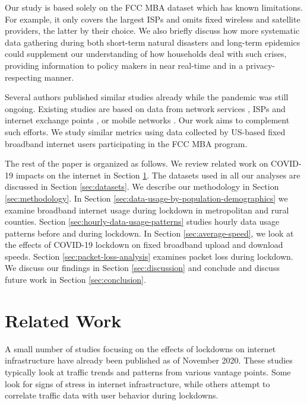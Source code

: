 \documentclass[conference,10pt]{IEEEtran}
\begin{document}
Our study is based solely on the FCC MBA dataset which has known limitations. For example, it only covers the largest ISPs and omits fixed wireless and satellite providers, the latter by their choice. We also briefly discuss how more systematic data gathering during both short-term natural disasters and long-term epidemics could supplement our understanding of how households deal with such crises, providing information to policy makers in near real-time and in a privacy-respecting manner.

Several authors published similar studies already while the pandemic was still ongoing. Existing studies are based on data from network services \cite{bottger2020internet,akamai,facebook}, ISPs and internet exchange points \cite{feldmann2020lockdown,liu2020characterizing}, or mobile networks \cite{lutu2020characterization}. Our work aims to complement such efforts. We study similar metrics using data collected by US-based fixed broadband internet users participating in the FCC MBA program.

The rest of the paper is organized as follows. We review related work on COVID-19 impacts on the internet in Section \ref{sec:related-work}. The datasets used in all our analyses are discussed in Section \ref{sec:datasets}. We describe our methodology in Section \ref{sec:methodology}. In Section \ref{sec:data-usage-by-population-demographics} we examine broadband internet usage during lockdown in metropolitan and rural counties. Section \ref{sec:hourly-data-usage-patterns} studies hourly data usage patterns before and during lockdown. In Section \ref{sec:average-speed}, we look at the effects of COVID-19 lockdown on fixed broadband upload and download speeds. Section \ref{sec:packet-loss-analysis} examines packet loss during lockdown. We discuss our findings in Section \ref{sec:discussion} and conclude and discuss future work in Section \ref{sec:conclusion}.

\section{Related Work}
\label{sec:related-work}



A small number of studies focusing on the effects of lockdowns on internet infrastructure have already been published as of November 2020. These studies typically look at traffic trends and patterns from various vantage points. Some look for signs of stress in internet infrastructure, while others attempt to correlate traffic data with user behavior during lockdowns.
\end{document}
